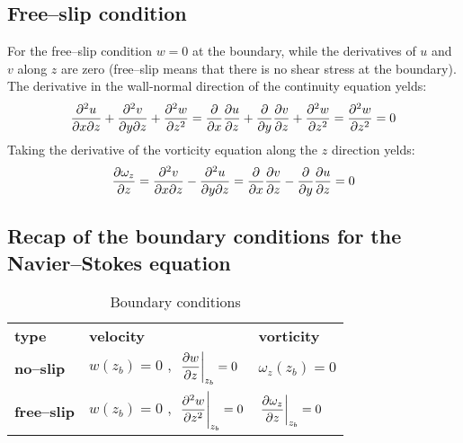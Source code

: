\subsection{Free--slip condition}
For the free--slip condition $w=0$ at the boundary, while the derivatives of $u$ and $v$ along $z$ are zero (free--slip means that there is no shear stress at the boundary).\\
The derivative in the wall-normal direction of the continuity equation yelds:
\[
\frac{\partial^2 u}{\partial x\partial z}+\frac{\partial^2 v}{\partial y\partial z}+\frac{\partial^2 w}{\partial z^2}=\frac{\partial}{\partial x}\frac{\partial u}{\partial z}+\frac{\partial}{\partial y}\frac{\partial v}{\partial z}+\frac{\partial^2 w}{\partial z^2}=\frac{\partial^2 w}{\partial z^2}=0
\]
Taking the derivative of the vorticity equation along the $z$ direction yelds:
\[
\frac{\partial\omega_z}{\partial z}=\frac{\partial^2 v}{\partial x\partial z}-\frac{\partial^2 u}{\partial y\partial z}=\frac{\partial}{\partial x}\frac{\partial v}{\partial z}-\frac{\partial}{\partial y}\frac{\partial u}{\partial z}=0
\]

\subsection{Recap of the boundary conditions for the Navier--Stokes equation}
\renewcommand\arraystretch{2.5}
\begin{table}[H]
\centering
\caption{Boundary conditions}
\begin{tabular}{>{\raggedright\arraybackslash}p{2.5cm}| >{\centering\arraybackslash}p{8 cm} |>{\centering\arraybackslash}p{5.2cm}}
\textbf{type} & \textbf{velocity} & \textbf{vorticity}\\
\textbf{no--slip} & $w(z_b)=0$ ,\, $\left.\dfrac{\partial w}{\partial z}\right|_{z_b}=0$ & $\omega_z(z_b)=0$ \\
\textbf{free--slip} &   $w(z_b)=0$ ,\, $\left.\dfrac{\partial^2 w}{\partial z^2}\right|_{z_b}=0$& $\left. \dfrac{\partial \omega_z}{\partial z} \right|_{z_b}=0$  \end{tabular}
\end{table}
\renewcommand\arraystretch{1}

